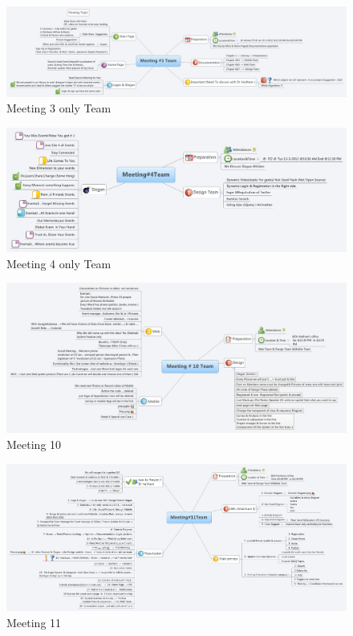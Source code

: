 \documentclass[12pt,a4paper,class,twoside,openany]{report}
\begin{document}
\begin{figure}
\begin{center}
\includegraphics[angle=90, width=2.25 in ]{2-11}
\caption{Meeting 3 only Team}
\label{fg:2-11}
\end{center}
\end{figure}
\begin{figure}
\begin{center}
\includegraphics[angle=90, width=2.80 in ]{2-12}
\caption{Meeting 4 only Team}
\label{fg:2-12}
\end{center}
\end{figure}
\begin{figure}
\begin{center}
\includegraphics[angle=90, width=4 in]{2-13}
\caption{Meeting 10}
\label{fg:2-13}
\end{center}
\end{figure}
\begin{figure}
\begin{center}
\includegraphics[angle=90, width=3.75 in]{2-14}
\caption{Meeting 11}
\label{fg:2-14}
\end{center}
\end{figure}
\end{document}
